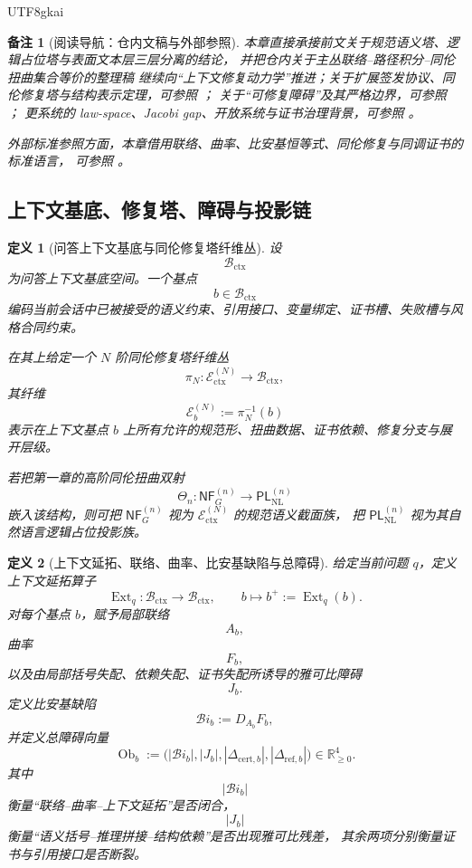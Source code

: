 \documentclass[12pt]{article}
\newtheorem{definition}{定义}[section]
\newtheorem{remark}{备注}[section]
\begin{document}
\begin{CJK*}{UTF8}{gkai}
\begin{remark}[阅读导航：仓内文稿与外部参照]
本章直接承接前文关于规范语义塔、逻辑占位塔与表面文本层三层分离的结论，
并把仓内关于主丛联络--路径积分--同伦扭曲集合等价的整理稿 \cite{RepoTex36HomotopyTwistBijection}
继续向“上下文修复动力学”推进；关于扩展签发协议、同伦修复塔与结构表示定理，可参照 \cite{RepoTex35ExtendedCertificationTower}；
关于“可修复障碍”及其严格边界，可参照 \cite{RepoTex29RepairableObstruction}；
更系统的 law-space、Jacobi gap、开放系统与证书治理背景，可参照 \cite{GaoZhengAppVol3}。

外部标准参照方面，本章借用联络、曲率、比安基恒等式、同伦修复与同调证书的标准语言，
可参照 \cite{KobayashiNomizu1963Foundations,Hatcher2002AT,Weibel1994HomologicalAlgebra}。
\end{remark}

\subsection{上下文基底、修复塔、障碍与投影链}
\label{subsec:tex37-ch4-definitions}

\begin{definition}[问答上下文基底与同伦修复塔纤维丛]
\label{def:tex37-ch4-base}
设
\[
  \mathcal{B}_{\mathrm{ctx}}
\]
为问答上下文基底空间。一个基点
\[
  b\in \mathcal{B}_{\mathrm{ctx}}
\]
编码当前会话中已被接受的语义约束、引用接口、变量绑定、证书槽、失败槽与风格合同约束。

在其上给定一个 $N$ 阶同伦修复塔纤维丛
\[
  \pi_N:\mathcal{E}^{(N)}_{\mathrm{ctx}}\to \mathcal{B}_{\mathrm{ctx}},
\]
其纤维
\[
  \mathcal{E}^{(N)}_b:=\pi_N^{-1}(b)
\]
表示在上下文基点 $b$ 上所有允许的规范形、扭曲数据、证书依赖、修复分支与展开层级。

若把第一章的高阶同伦扭曲双射
\[
  \Theta_n:\mathsf{NF}_G^{(n)}\to \mathsf{PL}_{\mathrm{NL}}^{(n)}
\]
嵌入该结构，则可把 $\mathsf{NF}_G^{(n)}$ 视为 $\mathcal{E}^{(N)}_{\mathrm{ctx}}$ 的规范语义截面族，
把 $\mathsf{PL}_{\mathrm{NL}}^{(n)}$ 视为其自然语言逻辑占位投影族。
\end{definition}

\begin{definition}[上下文延拓、联络、曲率、比安基缺陷与总障碍]
\label{def:tex37-ch4-obstruction}
给定当前问题 $q$，定义上下文延拓算子
\[
  \operatorname{Ext}_q:\mathcal{B}_{\mathrm{ctx}}\to \mathcal{B}_{\mathrm{ctx}},
  \qquad
  b\mapsto b^+:=\operatorname{Ext}_q(b).
\]
对每个基点 $b$，赋予局部联络
\[
  A_b,
\]
曲率
\[
  F_b,
\]
以及由局部括号失配、依赖失配、证书失配所诱导的雅可比障碍
\[
  J_b.
\]
定义比安基缺陷
\[
  \mathcal{B}\!i_b:=D_{A_b}F_b,
\]
并定义总障碍向量
\[
  \operatorname{Ob}_b
  :=
  \bigl(
    |\mathcal{B}\!i_b|,
    |J_b|,
    |\Delta_{\mathrm{cert},b}|,
    |\Delta_{\mathrm{ref},b}|
  \bigr)
  \in \mathbb{R}_{\ge 0}^{4}.
\]
其中
\[
  |\mathcal{B}\!i_b|
\]
衡量“联络--曲率--上下文延拓”是否闭合，
\[
  |J_b|
\]
衡量“语义括号--推理拼接--结构依赖”是否出现雅可比残差，
其余两项分别衡量证书与引用接口是否断裂。
\end{definition}


\end{CJK*}
\end{document}
